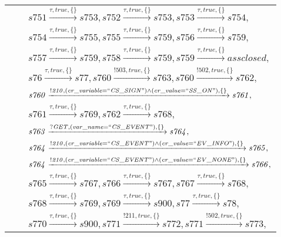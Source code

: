 \begin{tabular}{lcl}
& & $\mathit{s751}\xrightarrow{\mathit{\tau}, \mathit{true}, \{\}}\mathit{s753},\mathit{s752}\xrightarrow{\mathit{\tau}, \mathit{true}, \{\}}\mathit{s753},\mathit{s753}\xrightarrow{\mathit{\tau}, \mathit{true}, \{\}}\mathit{s754},$ \\
& & $\mathit{s754}\xrightarrow{\mathit{\tau}, \mathit{true}, \{\}}\mathit{s755},\mathit{s755}\xrightarrow{\mathit{\tau}, \mathit{true}, \{\}}\mathit{s759},\mathit{s756}\xrightarrow{\mathit{\tau}, \mathit{true}, \{\}}\mathit{s759},$ \\
& & $\mathit{s757}\xrightarrow{\mathit{\tau}, \mathit{true}, \{\}}\mathit{s759},\mathit{s758}\xrightarrow{\mathit{\tau}, \mathit{true}, \{\}}\mathit{s759},\mathit{s759}\xrightarrow{\mathit{\tau}, \mathit{true}, \{\}}\mathit{assclosed},$ \\
& & $\mathit{s76}\xrightarrow{\mathit{\tau}, \mathit{true}, \{\}}\mathit{s77},\mathit{s760}\xrightarrow{\mathit{!503}, \mathit{true}, \{\}}\mathit{s763},\mathit{s760}\xrightarrow{\mathit{!502}, \mathit{true}, \{\}}\mathit{s762},$ \\
& & $\mathit{s760}\xrightarrow{\mathit{!210}, \mathit{(cr\_variable = ``CS\_SIGN") \land (cr\_value = ``SS\_ON")}, \{\}}\mathit{s761},$ \\
& & $\mathit{s761}\xrightarrow{\mathit{\tau}, \mathit{true}, \{\}}\mathit{s769},\mathit{s762}\xrightarrow{\mathit{\tau}, \mathit{true}, \{\}}\mathit{s768},$ \\
& & $\mathit{s763}\xrightarrow{\mathit{?GET}, \mathit{(var\_name = ``CS\_EVENT")}, \{\}}\mathit{s764},$ \\
& & $\mathit{s764}\xrightarrow{\mathit{!210}, \mathit{(cr\_variable = ``CS\_EVENT") \land (cr\_value = ``EV\_INFO")}, \{\}}\mathit{s765},$ \\
& & $\mathit{s764}\xrightarrow{\mathit{!210}, \mathit{(cr\_variable = ``CS\_EVENT") \land (cr\_value = ``EV\_NONE")}, \{\}}\mathit{s766},$ \\
& & $\mathit{s765}\xrightarrow{\mathit{\tau}, \mathit{true}, \{\}}\mathit{s767},\mathit{s766}\xrightarrow{\mathit{\tau}, \mathit{true}, \{\}}\mathit{s767},\mathit{s767}\xrightarrow{\mathit{\tau}, \mathit{true}, \{\}}\mathit{s768},$ \\
& & $\mathit{s768}\xrightarrow{\mathit{\tau}, \mathit{true}, \{\}}\mathit{s769},\mathit{s769}\xrightarrow{\mathit{\tau}, \mathit{true}, \{\}}\mathit{s900},\mathit{s77}\xrightarrow{\mathit{\tau}, \mathit{true}, \{\}}\mathit{s78},$ \\
& & $\mathit{s770}\xrightarrow{\mathit{\tau}, \mathit{true}, \{\}}\mathit{s900},\mathit{s771}\xrightarrow{\mathit{!211}, \mathit{true}, \{\}}\mathit{s772},\mathit{s771}\xrightarrow{\mathit{!502}, \mathit{true}, \{\}}\mathit{s773},$ \\

\end{tabular}
